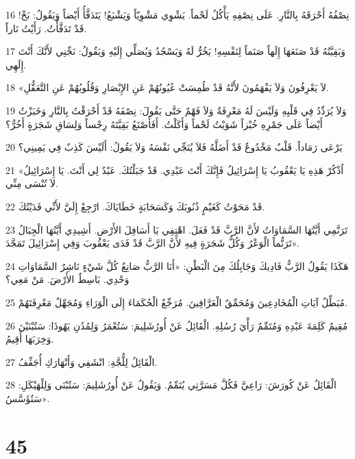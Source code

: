 \par 16 نِصْفُهُ أَحْرَقَهُ بِالنَّارِ. عَلَى نِصْفِهِ يَأْكُلُ لَحْماً. يَشْوِي مَشْوِيّاً وَيَشْبَعُ! يَتَدَفَّأُ أَيْضاً وَيَقُولُ: بَخْ! قَدْ تَدَفَّأْتُ. رَأَيْتُ نَاراً.
\par 17 وَبَقِيَّتُهُ قَدْ صَنَعَهَا إِلَهاً صَنَماً لِنَفْسِهِ! يَخُرُّ لَهُ وَيَسْجُدُ وَيُصَلِّي إِلَيْهِ وَيَقُولُ: نَجِّنِي لأَنَّكَ أَنْتَ إِلَهِي.
\par 18 «لاَ يَعْرِفُونَ وَلاَ يَفْهَمُونَ لأَنَّهُ قَدْ طُمِسَتْ عُيُونُهُمْ عَنِ الإِبْصَارِ وَقُلُوبُهُمْ عَنِ التَّعَقُّلِ.
\par 19 وَلاَ يُرَدِّدُ فِي قَلْبِهِ وَلَيْسَ لَهُ مَعْرِفَةٌ وَلاَ فَهْمٌ حَتَّى يَقُولَ: نِصْفَهُ قَدْ أَحْرَقْتُ بِالنَّارِ وَخَبَزْتُ أَيْضاً عَلَى جَمْرِهِ خُبْزاً شَوَيْتُ لَحْماً وَأَكَلْتُ. أَفَأَصْنَعُ بَقِيَّتَهُ رِجْساً وَلِسَاقِ شَجَرَةٍ أَخُرُّ؟
\par 20 يَرْعَى رَمَاداً. قَلْبٌ مَخْدُوعٌ قَدْ أَضَلَّهُ فَلاَ يُنَجِّي نَفْسَهُ وَلاَ يَقُولُ: أَلَيْسَ كَذِبٌ فِي يَمِينِي؟
\par 21 «اُذْكُرْ هَذِهِ يَا يَعْقُوبُ يَا إِسْرَائِيلُ فَإِنَّكَ أَنْتَ عَبْدِي. قَدْ جَبَلْتُكَ. عَبْدٌ لِي أَنْتَ. يَا إِسْرَائِيلُ لاَ تُنْسَى مِنِّي.
\par 22 قَدْ مَحَوْتُ كَغَيْمٍ ذُنُوبَكَ وَكَسَحَابَةٍ خَطَايَاكَ. ارْجِعْ إِلَيَّ لأَنِّي فَدَيْتُكَ.
\par 23 تَرَنَّمِي أَيَّتُهَا السَّمَاوَاتُ لأَنَّ الرَّبَّ قَدْ فَعَلَ. اهْتِفِي يَا أَسَافِلَ الأَرْضِ. أَشِيدِي أَيَّتُهَا الْجِبَالُ تَرَنُّماً الْوَعْرُ وَكُلُّ شَجَرَةٍ فِيهِ لأَنَّ الرَّبَّ قَدْ فَدَى يَعْقُوبَ وَفِي إِسْرَائِيلَ تَمَجَّدَ».
\par 24 هَكَذَا يَقُولُ الرَّبُّ فَادِيكَ وَجَابِلُكَ مِنَ الْبَطْنِ: «أَنَا الرَّبُّ صَانِعٌ كُلَّ شَيْءٍ نَاشِرٌ السَّمَاوَاتِ وَحْدِي. بَاسِطٌ الأَرْضَ. مَنْ مَعِي؟
\par 25 مُبَطِّلٌ آيَاتِ الْمُخَادِعِينَ وَمُحَمِّقٌ الْعَرَّافِينَ. مُرَجِّعٌ الْحُكَمَاءَ إِلَى الْوَرَاءِ وَمُجَهِّلٌ مَعْرِفَتَهُمْ.
\par 26 مُقِيمٌ كَلِمَةَ عَبْدِهِ وَمُتَمِّمٌ رَأْيَ رُسُلِهِ. الْقَائِلُ عَنْ أُورُشَلِيمَ: سَتُعْمَرُ وَلِمُدُنِ يَهُوذَا: سَتُبْنَيْنَ وَخِرَبَهَا أُقِيمُ.
\par 27 الْقَائِلُ لِلُّجَّةِ: انْشَفِي وَأَنْهَارَكِ أُجَفِّفُ.
\par 28 الْقَائِلُ عَنْ كُورَشَ: رَاعِيَّ فَكُلَّ مَسَرَّتِي يُتَمِّمُ. وَيَقُولُ عَنْ أُورُشَلِيمَ: سَتُبْنَى وَلِلْهَيْكَلِ: سَتُؤَسَّسُ».

\chapter{45}


